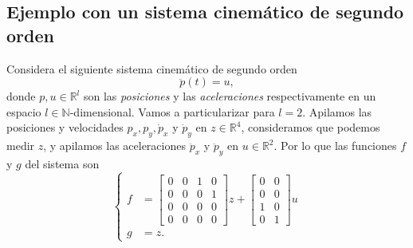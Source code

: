 \subsection{Ejemplo con un sistema cinemático de segundo orden}
Considera el siguiente sistema cinemático de segundo orden
\begin{equation}
	\ddot p(t) = u,
	\label{eq: pdyn}
\end{equation}
donde $p,u\in\mathbb{R}^l$ son las \emph{posiciones} y las \emph{aceleraciones} respectivamente en un espacio $l\in\mathbb{N}$-dimensional. Vamos a particularizar para $l=2$. Apilamos las posiciones y velocidades $p_x,p_y,\dot p_x$ y $\dot p_y$ en $z\in\mathbb{R}^4$, consideramos que podemos medir $z$, y apilamos las aceleraciones $\ddot p_x$ y $\ddot p_y$ en $u\in\mathbb{R}^2$. Por lo que las funciones $f$ y $g$ del sistema son
\begin{equation}
	\begin{cases}
		f &= \begin{bmatrix}0 & 0 & 1 & 0 \\ 0 & 0 & 0 & 1 \\
		0 & 0 & 0 & 0 \\ 0 & 0 & 0 & 0 \end{bmatrix} z + \begin{bmatrix}0 & 0  \\ 0 & 0  \\ 1 & 0 \\ 0 & 1\end{bmatrix} u \\
			g &= z.
\end{cases}
\end{equation}

